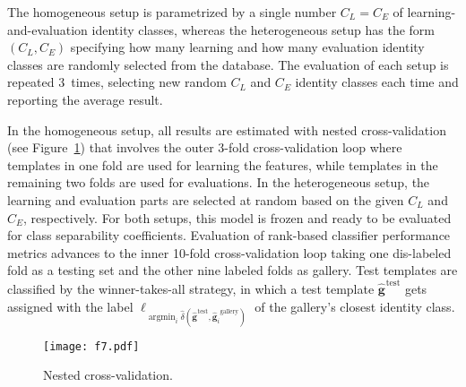 \documentclass[10pt,a4paper]{llncs}
\DeclareMathOperator{\argmin}{argmin} %
\newcommand{\gC}{\ensuremath{C}} %
\newcommand{\gDELTAccH}[2]{\ensuremath{\gH{\delta}\left(#1,#2\right)}} %
\newcommand{\gGnH}[1]{\ensuremath{\gH{\gB{g}}_{#1}}} %
\newcommand{\gLAMBDAn}[1]{\ensuremath{\ell_{#1}}} %
\newcommand{\gB}[1]{\ensuremath{\mathbf{#1}}} %
\newcommand{\gH}[1]{\ensuremath{\widehat{#1}}} %
\newcommand{\gL}[1]{\ensuremath{{#1}_L}} %
\newcommand{\gE}[1]{\ensuremath{{#1}_E}} %
\begin{document}
The homogeneous setup is parametrized by a single number $\gL{\gC}=\gE{\gC}$ of learning-and-evaluation identity classes, whereas the heterogeneous setup has the form $\left(\gL{\gC},\gE{\gC}\right)$ specifying how many learning and how many evaluation identity classes are randomly selected from the database. The evaluation of each setup is repeated 3~times, selecting new random $\gL{\gC}$ and $\gE{\gC}$ identity classes each time and reporting the average result.

In the homogeneous setup, all results are estimated with nested cross-validation (see Figure~\ref{f7}) that involves the outer 3-fold cross-validation loop where templates in one fold are used for learning the features, while templates in the remaining two folds are used for evaluations. In the heterogeneous setup, the learning and evaluation parts are selected at random based on the given $\gL{\gC}$ and $\gE{\gC}$, respectively. For both setups, this model is frozen and ready to be evaluated for class separability coefficients. Evaluation of rank-based classifier performance metrics advances to the inner 10-fold cross-validation loop taking one dis-labeled fold as a testing set and the other nine labeled folds as gallery. Test templates are classified by the winner-takes-all strategy, in which a test template $\gGnH{}^{\mathrm{test}}$ gets assigned with the label $\gLAMBDAn{\argmin_i\gDELTAccH{\gGnH{}^{\mathrm{test}}}{\gGnH{i}^{\mathrm{gallery}}}}$ of the gallery's closest identity class.

\begin{figure}[ht]
\centering
\texttt{[image: f7.pdf]}
\caption{Nested cross-validation.}
\label{f7}
\end{figure}
\end{document}
